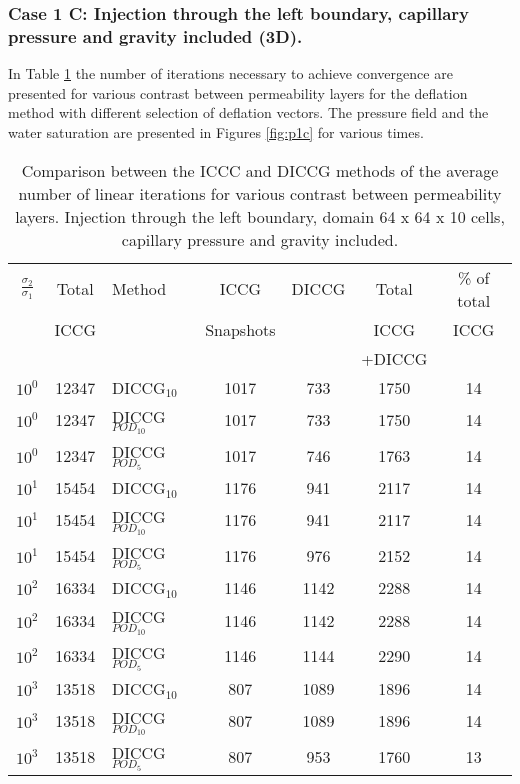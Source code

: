 \documentclass[12pt]{article}
\begin{document}
\subsubsection*{Case 1 C: Injection through the left boundary, capillary pressure and gravity included (3D).}
In Table \ref{table:liter1c} the number of iterations necessary to achieve convergence are presented for various contrast between permeability layers for the deflation method with different selection of deflation vectors.   
The pressure field and the water saturation are presented in Figures \ref{fig:p1c} for various times.
\begin{table}[!h]\centering
\begin{minipage}{1\textwidth}
 \centering
\begin{tabular}{ ||c|c||l|c|c|c|c||} 
\hline
$\frac{\sigma_2}{\sigma_1}$&Total&Method  & ICCG&DICCG &Total&\% of total\\ 
                           & ICCG     &  & Snapshots& &ICCG& ICCG\\ 
                            &     &  & & &+DICCG& \\
\hline 
$10^{0}$ &12347& DICCG$_{10}$&1017&733&1750&14\\ 
\hline  
$10^{0}$ &12347& DICCG$_{POD_{10}}$&1017&733&1750&14 \\ 
\hline  
$10^{0}$ &12347& DICCG$_{POD_{5}}$&1017&746&1763&14 \\ 
\hline 
$10^{1}$ &15454& DICCG$_{10}$&1176&941&2117&14\\ 
\hline  
$10^{1}$ &15454& DICCG$_{POD_{10}}$&1176&941&2117&14 \\ 
\hline  
$10^{1}$ &15454& DICCG$_{POD_{5}}$&1176&976&2152&14 \\ 
\hline 
$10^{2}$ &16334& DICCG$_{10}$&1146&1142&2288&14\\ 
\hline  
$10^{2}$ &16334& DICCG$_{POD_{10}}$&1146&1142&2288&14 \\ 
\hline  
$10^{2}$ &16334& DICCG$_{POD_{5}}$&1146&1144&2290&14 \\ 
\hline  
$10^{3}$ &13518& DICCG$_{10}$&807&1089&1896&14\\ 
\hline  
$10^{3}$ &13518& DICCG$_{POD_{10}}$&807&1089&1896&14 \\ 
\hline  
$10^{3}$ &13518& DICCG$_{POD_{5}}$&807&953&1760&13 \\ 
\hline
\end{tabular} 
\caption{Comparison between the ICCC and DICCG methods of the average number of linear iterations for various contrast between permeability layers. Injection through the left boundary, domain 64 x 64 x 10 cells, capillary pressure and gravity included.}\label{table:liter1c} 
\end{minipage}  
\end{table}  
\end{document}
